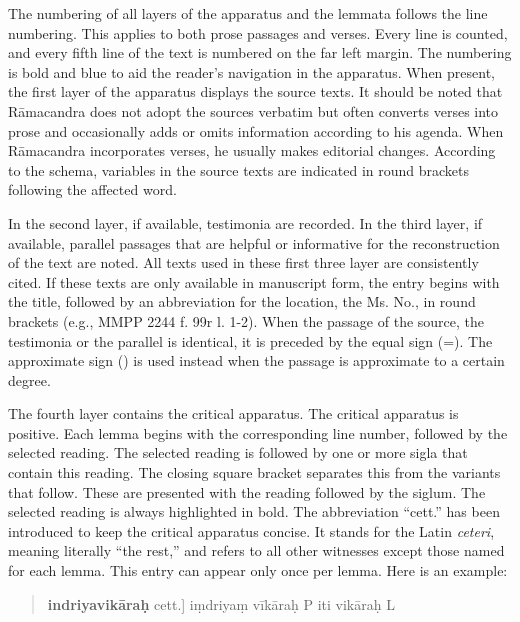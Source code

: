 The numbering of all layers of the apparatus and the lemmata follows the line numbering. This applies to both prose passages and verses. Every line is counted, and every fifth line of the text is numbered on the far left margin. The numbering is bold and blue to aid the reader's navigation in the apparatus.
When present, the first layer of the apparatus displays the source texts. It should be noted that Rāmacandra does not adopt the sources verbatim but often converts verses into prose and occasionally adds or omits information according to his agenda. When Rāmacandra incorporates verses, he usually makes editorial changes. According to the schema, variables in the source texts are indicated in round brackets following the affected word.

In the second layer, if available, testimonia are recorded. In the third layer, if available, parallel passages that are helpful or informative for the reconstruction of the text are noted. All texts used in these first three layer are consistently cited. If these texts are only available in manuscript form, the entry begins with the title, followed by an abbreviation for the location, the Ms. No., in round brackets (e.g., MMPP 2244 f. 99r l. 1-2). When the passage of the source, the testimonia or the parallel is identical, it is preceded by the equal sign (=). The approximate sign (\approx) is used instead when the passage is approximate to a certain degree. 

The fourth layer contains the critical apparatus. The critical apparatus is positive. Each lemma begins with the corresponding line number, followed by the selected reading. The selected reading is followed by one or more sigla that contain this reading. The closing square bracket separates this from the variants that follow. These are presented with the reading followed by the siglum. The selected reading is always highlighted in bold. The abbreviation ``cett.'' has been introduced to keep the critical apparatus concise. It stands for the Latin \textit{ceteri}, meaning literally ``the rest,'' and refers to all other witnesses except those named for each lemma. This entry can appear only once per lemma. Here is an example:


\begin{quote}
  \textbf{indriyavikāraḥ} cett.] iṃdriyaṃ vīkāraḥ P iti vikāraḥ L
  \end{quote}

